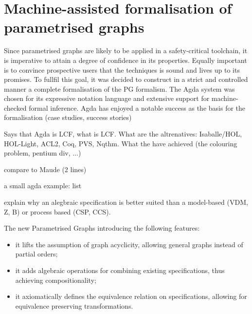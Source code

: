 \section{Machine-assisted formalisation of parametrised graphs}


Since parametrised graphs are likely to be applied in a safety-critical toolchain, it is imperative to attain a degree of confidence in its properties. Equally important is to convince prospective users that the techniques is sound and lives up to its promises. To fullfil this goal, it was decided to construct in a strict and controlled manner a complete formalisation of the PG formalism. The Agda system \cite{agda} was chosen for its expressive notation language and extensive support for machine-checked formal inference. Agda has enjoyed a notable success as the basis for the formalisation (case studies, success stories)

Says that Agda is LCF, what is LCF. What are the altrenatives: Isaballe/HOL, HOL-Light, ACL2, Coq, PVS, Nqthm. What the have achieved (the colouring problem, pentium div, ...)

compare to Maude (2 lines)

a small agda example: list 

explain why an alegbraic specification is better suited than a model-based (VDM, Z, B) or process based (CSP, CCS).


The new Parametrised Graphs  introducing the following features:
\begin{itemize}
\item{it lifts the assumption of graph acyclicity, allowing general graphs instead of partial orders;}
\item{it adds algebraic operations for combining existing specifications, thus achieving compositionality;}
\item{it axiomatically defines the equivalence relation on specifications, allowing for equivalence preserving transformations.}
\end{itemize}

